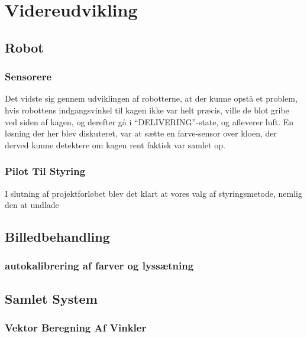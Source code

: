 \chapter{Videreudvikling}
\section{Robot}
\subsection{Sensorere}
Det vidste sig gennem udviklingen af robotterne, at der kunne opstå et problem, hvis robottens indgangsvinkel til kagen ikke var helt præcis, ville de blot gribe ved siden af kagen, og derefter gå i "`DELIVERING"'-state, og afleverer luft. En løsning der her blev diskuteret, var at sætte en farve-sensor over kloen, der derved kunne detektere om kagen rent faktisk var samlet op.

\subsection{Pilot Til Styring}
I slutning af projektforløbet blev det klart at vores valg af styringsmetode, nemlig den at undlade

\section{Billedbehandling}
\subsection{autokalibrering af farver og lyssætning}
\section{Samlet System}
\subsection{Vektor Beregning Af Vinkler}
